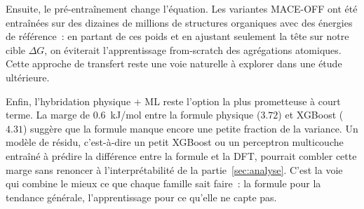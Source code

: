 Ensuite, le pré-entraînement change l'équation. Les variantes MACE-OFF\cite{kovacs2023maceoff} ont été entraînées sur des dizaines de millions de structures organiques avec des énergies de référence~: en partant de ces poids et en ajustant seulement la tête sur notre cible $\Delta G$, on éviterait l'apprentissage from-scratch des agrégations atomiques. Cette approche de transfert reste une voie naturelle à explorer dans une étude ultérieure.

Enfin, l'hybridation physique + ML reste l'option la plus prometteuse à court terme. La marge de \SI{0.6}{kJ/mol} entre la formule physique ($3.72$) et XGBoost ($4.31$) suggère que la formule manque encore une petite fraction de la variance. Un modèle de résidu, c'est-à-dire un petit XGBoost ou un perceptron multicouche entraîné à prédire la différence entre la formule et la DFT, pourrait combler cette marge sans renoncer à l'interprétabilité de la partie~\ref{sec:analyse}. C'est la voie qui combine le mieux ce que chaque famille sait faire~: la formule pour la tendance générale, l'apprentissage pour ce qu'elle ne capte pas.
